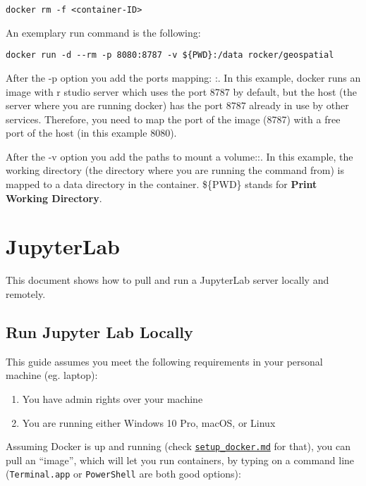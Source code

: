 \documentclass[
]{book}
\providecommand{\tightlist}{%
  \setlength{\itemsep}{0pt}\setlength{\parskip}{0pt}}
\begin{document}
\begin{verbatim}
docker rm -f <container-ID>
\end{verbatim}

An exemplary run command is the following:

\begin{verbatim}
docker run -d --rm -p 8080:8787 -v ${PWD}:/data rocker/geospatial
\end{verbatim}

After the -p option you add the ports mapping: :. In this example, docker runs an image with r studio server which uses the port 8787 by default, but the host (the server where you are running docker) has the port 8787 already in use by other services. Therefore, you need to map the port of the image (8787) with a free port of the host (in this example 8080).

After the -v option you add the paths to mount a volume::. In this example, the working directory (the directory where you are running the command from) is mapped to a data directory in the container. \$\{PWD\} stands for \textbf{Print Working Directory}.

\hypertarget{jupyterlab}{%
\chapter{JupyterLab}\label{jupyterlab}}

This document shows how to pull and run a JupyterLab server locally and
remotely.

\hypertarget{run-jupyter-lab-locally}{%
\section{Run Jupyter Lab Locally}\label{run-jupyter-lab-locally}}

This guide assumes you meet the following requirements in your personal
machine (eg. laptop):

\begin{enumerate}
\def\labelenumi{\arabic{enumi}.}
\tightlist
\item
  You have admin rights over your machine
\item
  You are running either Windows 10 Pro, macOS, or Linux
\end{enumerate}

Assuming Docker is up and running (check \href{setup_docker.md}{\texttt{setup\_docker.md}}
for that), you can pull an ``image'', which will let you
run containers, by typing on a command line (\texttt{Terminal.app} or \texttt{PowerShell}
are both good options):
\end{document}
